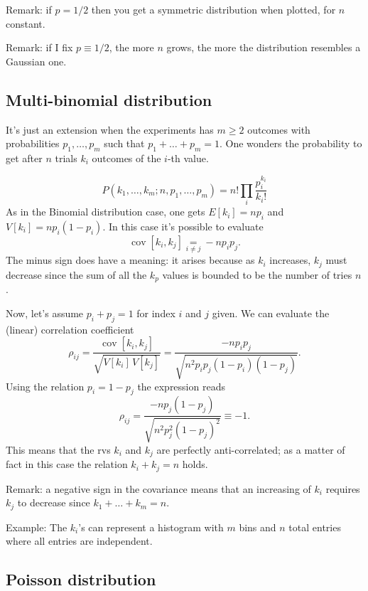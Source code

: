 \documentclass[
	10pt,
	draft
]{scrreprt}
\DeclareMathOperator{\cov}{cov}
\begin{document}
Remark: if $p=1/2$ then you get a symmetric distribution when plotted, for $n$ constant.


Remark: if I fix $p \equiv 1/2$, the more $n$ grows, the more the distribution resembles a Gaussian one.

	\subsection{Multi-binomial distribution}

It's just an extension when the experiments has $m\ge2$ outcomes with probabilities ${p_1,\dots,p_m}$ such that $p_1 + \dots + p_m = 1$.
One wonders the probability to get after $n$ trials $k_i$ outcomes of the $i$-th value.

\begin{equation}
P(k_1,\dots,k_m; n, p_1,\dots,p_m) = n! \prod_i\frac{p_i^{k_i}}{k_i!}
\end{equation}
As in the Binomial distribution case, one gets $E[k_i] = np_i$ and $V[k_i] = np_i(1-p_i)$.
In this case it's possible to evaluate
\begin{equation}
\cov[k_i,k_j] \underset{i\neq j}{=} - n p_ip_j.
\end{equation}
The minus sign does have a meaning: it arises because as $k_i$ increases, $k_j$ must decrease since the sum of all the $k_p$ values is bounded to be the number of tries $n$.


Now, let's assume $p_i + p_j = 1$ for index $i$ and $j$ given.
We can evaluate the (linear) correlation  coefficient
\begin{equation}
\rho_{ij} = \frac{\cov[k_i,k_j]}{\sqrt{V[k_i]\,V[k_j]}} =
\frac{-n p_ip_j}{\sqrt{n^2p_ip_j(1-p_i)(1-p_j)}}.
\end{equation}
Using the relation $p_i = 1-p_j$ the expression reads
\begin{equation}
\rho_{ij} = \frac{-n p_j(1-p_j)}{\sqrt{n^2 p_j^2(1-p_j)^2} }\equiv -1.
\end{equation}
This means that the \acp{rv} $k_i$ and $k_j$ are perfectly anti-correlated; as a matter of fact in this case the relation $k_i + k_j = n$ holds.

Remark: a negative sign in the covariance means that an increasing of $k_i$ requires $k_j$ to decrease since $k_1+\dots+k_m= n$.

Example: The $k_i$'s can represent a histogram with $m$ bins and $n$ total entries where all entries are independent.


	\subsection{Poisson distribution}
\end{document}
